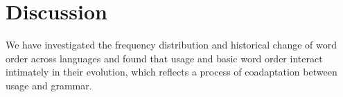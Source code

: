 \documentclass[11pt,a4paper]{article}
\begin{document}










\section*{Discussion}

We have investigated the frequency distribution and historical change of word order  across languages and found that usage and basic word order interact intimately in their evolution,  which reflects a process of coadaptation  between usage and grammar.





\end{document}
